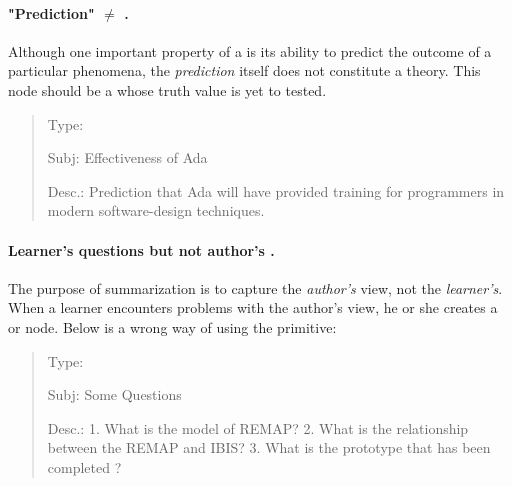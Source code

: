 \paragraph{"Prediction" \(\neq\) .}

Although one important property of a  is its ability
to predict the outcome of a particular phenomena, the {\it prediction\/}
itself does not constitute a theory. This node should be a  whose truth value is yet to tested.

\small
\begin{quote}
  \begin{itemizenoindent}
  \item {\sf Type:\/} 
    
  \item {\sf Subj: Effectiveness of Ada\/}

  \item {\sf Desc.}: Prediction that Ada will have provided training
    for programmers in modern software-design techniques.

  \end{itemizenoindent}
\end{quote}
\normalsize
{}


\paragraph{Learner's questions but not author's .}

The purpose of summarization is to capture the {\it author's\/} view, not
the {\it learner's\/}. When a learner encounters problems with the author's
view, he or she creates a  or 
node. Below is a wrong way of using the  primitive:

\small
\begin{quote}
 \begin{itemizenoindent}
   
 \item {\sf Type}: 
 
\item {\sf Subj}: Some Questions
 
\item {\sf Desc.}: 1. What is the model of REMAP?  2. What is the
  relationship between the REMAP and IBIS?  3. What is the prototype that has
  been completed ?
 \end{itemizenoindent}
\end{quote}
\normalsize
{}



